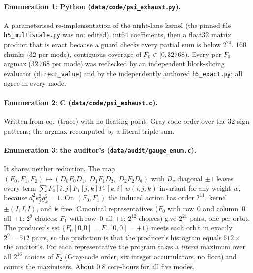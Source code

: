 \documentclass[10pt]{article}
\begin{document}
\paragraph{Enumeration 1: Python (\texttt{data/code/psi\_exhaust.py}).} A parameterised re-implementation of the night-lane kernel (the pinned file \texttt{h5\_multiscale.py} was not edited). int64 coefficients, then a float32 matrix product that is exact because a guard checks every partial sum is below $2^{24}$. $160$ chunks (32 per mode), contiguous coverage of $F_0\in[0,32768)$. Every per-$F_0$ argmax ($32\,768$ per mode) was rechecked by an independent block-slicing evaluator (\texttt{direct\_value}) and by the independently authored \texttt{h5\_exact.py}; all agree in every mode.

\paragraph{Enumeration 2: C (\texttt{data/code/psi\_exhaust.c}).} Written from eq.~(trace) with no floating point; Gray-code order over the $32$ sign patterns; the argmax recomputed by a literal triple sum.

\paragraph{Enumeration 3: the auditor's (\texttt{data/audit/gauge\_enum.c}).} It shares neither reduction. The map $(F_0,F_1,F_2)\mapsto(D_0F_0D_1,\;D_1F_1D_2,\;D_2F_2D_0)$ with $D_v$ diagonal $\pm1$ leaves every term $\sum F_0[i,j]F_1[j,k]F_2[k,i]\,w(i,j,k)$ invariant for any weight $w$, because $d_i^2e_j^2g_k^2=1$. On $(F_0,F_1)$ the induced action has order $2^{11}$, kernel $\pm(I,I,I)$, and is free. Canonical representatives ($F_0$ with row~0 and column~0 all $+1$: $2^9$ choices; $F_1$ with row~0 all $+1$: $2^{12}$ choices) give $2^{21}$ pairs, one per orbit. The producer's set $\{F_0[0,0]=F_1[0,0]=+1\}$ meets each orbit in exactly $2^9=512$ pairs, so the prediction is that the producer's histogram equals $512\times$ the auditor's. For each representative the program takes a \emph{literal} maximum over all $2^{16}$ choices of $F_2$ (Gray-code order, six integer accumulators, no float) and counts the maximisers. About $0.8$ core-hours for all five modes.

\end{document}
